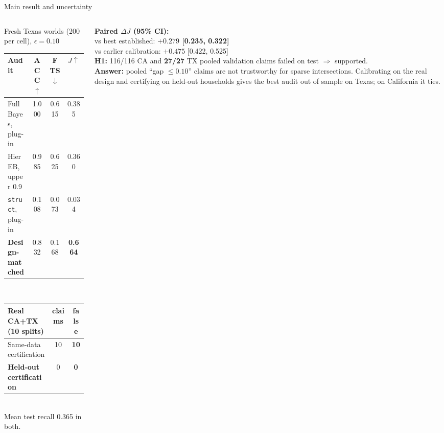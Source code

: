 \documentclass[aspectratio=169,11pt]{beamer}
\newcommand{\good}[1]{\textcolor{green!45!black}{\textbf{#1}}}
\newcommand{\bad}[1]{\textcolor{red!70!black}{\textbf{#1}}}
\begin{document}
\begin{frame}{Main result and uncertainty}
\begin{columns}[T]
\begin{column}{0.5\textwidth}
\footnotesize Fresh Texas worlds (200 per cell), $\epsilon=0.10$\\[2pt]
\begin{tabular}{lccc}\toprule
Audit & ACC$\uparrow$ & FTS$\downarrow$ & $J\uparrow$\\\midrule
Full Bayes, plug-in & 1.000 & 0.615 & 0.385\\
Hier EB, upper 0.9 & 0.985 & 0.625 & 0.360\\
\texttt{struct}, plug-in & 0.108 & 0.073 & 0.034\\
\textbf{Design-matched} & 0.832 & 0.168 & \good{0.664}\\\bottomrule
\end{tabular}\\[6pt]
\begin{tabular}{lcc}\toprule
Real CA+TX (10 splits) & claims & false\\\midrule
Same-data certification & 10 & \bad{10}\\
\textbf{Held-out certification} & 0 & \good{0}\\\bottomrule
\end{tabular}\\[2pt]
Mean test recall 0.365 in both.
\end{column}
\begin{column}{0.48\textwidth}
\textbf{Paired $\Delta J$ (95\% CI):}\\
vs best established: \good{$+0.279$ [0.235, 0.322]}\\
vs earlier calibration: $+0.475$ [0.422, 0.525]\\[6pt]
\textbf{H1:} 116/116 CA and \textbf{27/27} TX pooled validation claims failed on test $\Rightarrow$ supported.\\[6pt]
\textbf{Answer:} pooled ``gap $\le0.10$'' claims are not trustworthy for sparse intersections. Calibrating on the
real design and certifying on held-out households gives the best audit out of sample on Texas; on California it ties.
\end{column}
\end{columns}
\end{frame}
\end{document}
